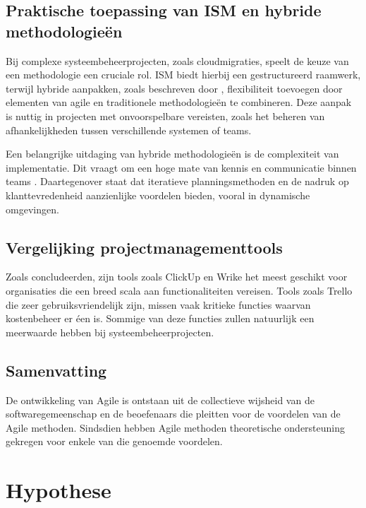 \documentclass{article}
\begin{document}
    \subsection{Praktische toepassing van ISM en hybride methodologieën}

    Bij complexe systeembeheerprojecten, zoals cloudmigraties, speelt de keuze van een methodologie een cruciale rol. 
    ISM biedt hierbij een gestructureerd raamwerk, terwijl hybride aanpakken, zoals beschreven door \textcite{reiff2022hybrid}, flexibiliteit toevoegen door elementen van agile en traditionele methodologieën te combineren. 
    Deze aanpak is nuttig in projecten met onvoorspelbare vereisten, zoals het beheren van afhankelijkheden tussen verschillende systemen of teams. \newline

    Een belangrijke uitdaging van hybride methodologieën is de complexiteit van implementatie. 
    Dit vraagt om een hoge mate van kennis en communicatie binnen teams \autocite{reiff2022hybrid}. 
    Daartegenover staat dat iteratieve planningsmethoden en de nadruk op klanttevredenheid aanzienlijke voordelen bieden, vooral in dynamische omgevingen.

    \subsection{Vergelijking projectmanagementtools}

    Zoals \textcite{pasaric2022comparison} concludeerden, zijn tools zoals ClickUp en Wrike het meest geschikt voor organisaties die een breed scala aan functionaliteiten vereisen. 
    Tools zoals Trello die zeer gebruiksvriendelijk zijn, missen vaak kritieke functies waarvan kostenbeheer er éen is. 
    Sommige van deze functies zullen natuurlijk een meerwaarde hebben bij systeembeheerprojecten.

    \subsection{Samenvatting}

    De ontwikkeling van Agile is ontstaan ​​uit de collectieve wijsheid van de softwaregemeenschap en de beoefenaars die pleitten voor de voordelen van de Agile methoden. 
    Sindsdien hebben Agile methoden theoretische ondersteuning gekregen voor enkele van die genoemde voordelen. \autocite{STRAY2022107058}

    \section{Hypothese}
\end{document}
